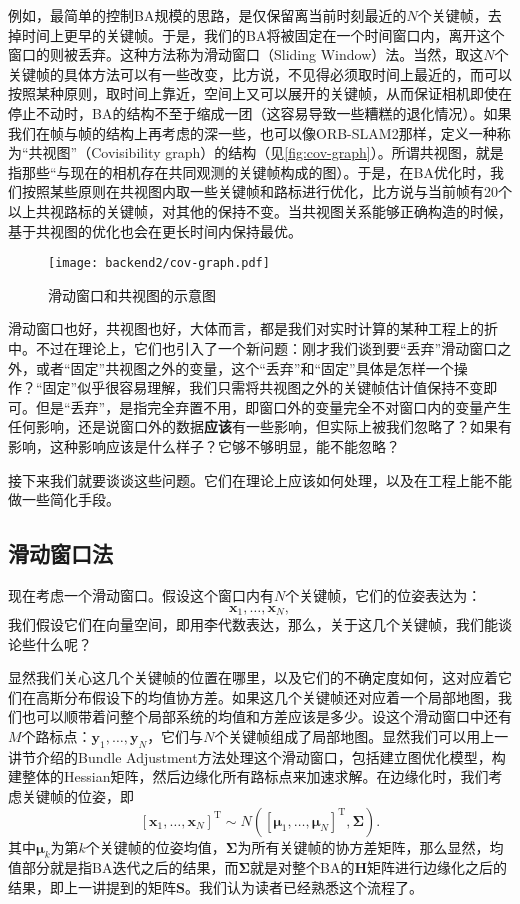 例如，最简单的控制BA规模的思路，是仅保留离当前时刻最近的$N$个关键帧，去掉时间上更早的关键帧。于是，我们的BA将被固定在一个时间窗口内，离开这个窗口的则被丢弃。这种方法称为滑动窗口（Sliding Window）法\textsuperscript{\cite{Sibley2008}}。当然，取这$N$个关键帧的具体方法可以有一些改变，比方说，不见得必须取时间上最近的，而可以按照某种原则，取时间上靠近，空间上又可以展开的关键帧，从而保证相机即使在停止不动时，BA的结构不至于缩成一团（这容易导致一些糟糕的退化情况）。如果我们在帧与帧的结构上再考虑的深一些，也可以像ORB-SLAM2\textsuperscript{\cite{Mur-Artal2015}}那样，定义一种称为“共视图”（Covisibility graph）的结构（见\autoref{fig:cov-graph}）。所谓共视图，就是指那些“与现在的相机存在共同观测的关键帧构成的图）。于是，在BA优化时，我们按照某些原则在共视图内取一些关键帧和路标进行优化，比方说与当前帧有20个以上共视路标的关键帧，对其他的保持不变。当共视图关系能够正确构造的时候，基于共视图的优化也会在更长时间内保持最优。

\begin{figure}[!ht]
	\centering
	\texttt{[image: backend2/cov-graph.pdf]}
	\caption{滑动窗口和共视图的示意图}
	\label{fig:cov-graph}
\end{figure}

滑动窗口也好，共视图也好，大体而言，都是我们对实时计算的某种工程上的折中。不过在理论上，它们也引入了一个新问题：刚才我们谈到要“丢弃”滑动窗口之外，或者“固定”共视图之外的变量，这个“丢弃”和“固定”具体是怎样一个操作？“固定”似乎很容易理解，我们只需将共视图之外的关键帧估计值保持不变即可。但是“丢弃”，是指完全弃置不用，即窗口外的变量完全不对窗口内的变量产生任何影响，还是说窗口外的数据\textbf{应该}有一些影响，但实际上被我们忽略了？如果有影响，这种影响应该是什么样子？它够不够明显，能不能忽略？

接下来我们就要谈谈这些问题。它们在理论上应该如何处理，以及在工程上能不能做一些简化手段。

\subsection{滑动窗口法}
现在考虑一个滑动窗口。假设这个窗口内有$N$个关键帧，它们的位姿表达为：$$\bm{x}_1, \ldots, \bm{x}_N,$$我们假设它们在向量空间，即用李代数表达，那么，关于这几个关键帧，我们能谈论些什么呢？

显然我们关心这几个关键帧的位置在哪里，以及它们的不确定度如何，这对应着它们在高斯分布假设下的均值协方差。如果这几个关键帧还对应着一个局部地图，我们也可以顺带着问整个局部系统的均值和方差应该是多少。设这个滑动窗口中还有$M$个路标点：$\bm{y}_1, \ldots, \bm{y}_N$，它们与$N$个关键帧组成了局部地图。显然我们可以用上一讲节介绍的Bundle Adjustment方法处理这个滑动窗口，包括建立图优化模型，构建整体的Hessian矩阵，然后边缘化所有路标点来加速求解。在边缘化时，我们考虑关键帧的位姿，即$$[\bm{x}_1, \ldots, \bm{x}_N]^\mathrm{T} \sim N([\boldsymbol{\mu}_1, \ldots, \boldsymbol{\mu}_N]^\mathrm{T},  \boldsymbol{\Sigma}).$$ 其中$\boldsymbol{\mu}_k$为第$k$个关键帧的位姿均值，$\boldsymbol{\Sigma}$为所有关键帧的协方差矩阵，那么显然，均值部分就是指BA迭代之后的结果，而$\boldsymbol{\Sigma}$就是对整个BA的$\bm{H}$矩阵进行边缘化之后的结果，即上一讲提到的矩阵$\bm{S}$。我们认为读者已经熟悉这个流程了。

